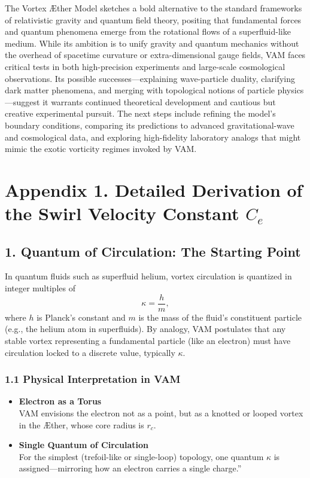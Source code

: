 \documentclass[a4paper,12pt]{article}
\begin{document}
The Vortex Æther Model sketches a bold alternative to the standard frameworks of relativistic gravity and quantum field theory, positing that fundamental forces and quantum phenomena emerge from the rotational flows of a superfluid-like medium. While its ambition is to unify gravity and quantum mechanics without the overhead of spacetime curvature or extra-dimensional gauge fields, VAM faces critical tests in both high-precision experiments and large-scale cosmological observations. Its possible successes—explaining wave-particle duality, clarifying dark matter phenomena, and merging with topological notions of particle physics—suggest it warrants continued theoretical development and cautious but creative experimental pursuit. The next steps include refining the model's boundary conditions, comparing its predictions to advanced gravitational-wave and cosmological data, and exploring high-fidelity laboratory analogs that might mimic the exotic vorticity regimes invoked by VAM.



    \newpage \appendix \label{sec:Part-4} %

\section*{Appendix 1. Detailed Derivation of the Swirl Velocity Constant \(C_e\)}

\subsection*{1. Quantum of Circulation: The Starting Point}

In quantum fluids such as superfluid helium, vortex circulation is quantized in integer multiples of
\[
    \kappa = \frac{h}{m},
\]
where \(h\) is Planck's constant and \(m\) is the mass of the fluid's constituent particle (e.g., the helium atom in superfluids). By analogy, VAM postulates that any stable vortex representing a fundamental particle (like an electron) must have circulation locked to a discrete value, typically \(\kappa\).

\subsubsection*{1.1 Physical Interpretation in VAM}
\begin{itemize}
    \item \textbf{Electron as a Torus} \\
    VAM envisions the electron not as a point, but as a knotted or looped vortex in the Æther, whose core radius is \(r_c\).
    \item \textbf{Single Quantum of Circulation} \\
    For the simplest (trefoil-like or single-loop) topology, one quantum \(\kappa\) is assigned—mirroring how an electron carries a single \grqq charge.\textquotedblright
\end{itemize}
\end{document}
